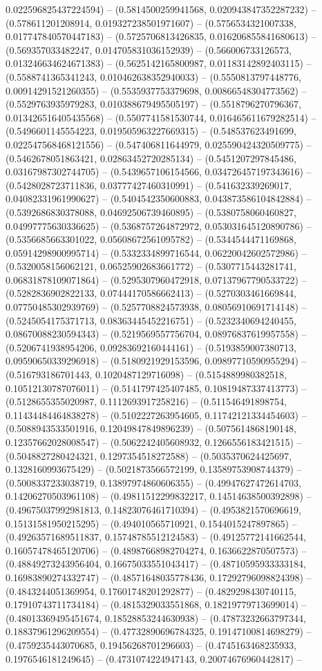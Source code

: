 0.022596825437224594) -- (0.5814500259941568, 0.020943847352287232) -- (0.578611201208914, 0.019327238501971607) -- (0.5756534321007338, 0.017747840570447183) -- (0.5725706813426835, 0.016206855841680613) -- (0.569357033482247, 0.014705831036152939) -- (0.566006733126573, 0.013246634624671383) -- (0.5625142165800987, 0.01183142892403115) -- (0.5588741365341243, 0.010462638352940033) -- (0.5550813797448776, 0.00914291521260355) -- (0.5535937753379698, 0.00866548304773562) -- (0.5529763935979283, 0.010388679495505197) -- (0.5518796270796367, 0.013426516405435568) -- (0.5507741581530744, 0.016465611679282514) -- (0.5496601145554223, 0.019505963227669315) -- (0.548537623491699, 0.022547568468121556) -- (0.547406811644979, 0.025590424320509775) -- (0.5462678051863421, 0.02863452720285134) -- (0.5451207297845486, 0.03167987302744705) -- (0.5439657106154566, 0.034726457197343616) -- (0.5428028723711836, 0.03777427460310991) -- (0.541632339269017, 0.04082331961990627) -- (0.5404542350600883, 0.043873586104842884) -- (0.5392686830378088, 0.04692506739460895) -- (0.5380758060460827, 0.04997775630336625) -- (0.5368757264872972, 0.053031645120890786) -- (0.5356685663301022, 0.05608672561095782) -- (0.5344544471169868, 0.05914298900995714) -- (0.5332334899716544, 0.06220042602572986) -- (0.5320058156062121, 0.06525902683661772) -- (0.5307715443281741, 0.06831878109071864) -- (0.5295307960472918, 0.07137967790533722) -- (0.5282836902822133, 0.07444170586662413) -- (0.5270303461669844, 0.07750485302939769) -- (0.5257708824573938, 0.08056910691714148) -- (0.5245054175371713, 0.08363445452216751) -- (0.5232340694240455, 0.08670088230594343) -- (0.5219569557756704, 0.08976837619957558) -- (0.5206741938954206, 0.09283692160444161) -- (0.5193859007380713, 0.09590650339296918) -- (0.5180921929153596, 0.09897710590955294) -- (0.516793186701443, 0.1020487129716098) -- (0.5154889980382518, 0.10512130787076011) -- (0.5141797425407485, 0.10819487337413773) -- (0.5128655355020987, 0.1112693917258216) -- (0.511546491898754, 0.11434484464838278) -- (0.5102227263954605, 0.11742121334454603) -- (0.5088943533501916, 0.12049847849896239) -- (0.5075614868190148, 0.12357662028008547) -- (0.5062242405608932, 0.1266556183421515) -- (0.5048827280424321, 0.1297354518272588) -- (0.5035370624425697, 0.1328160993675429) -- (0.5021873566572199, 0.13589753908744379) -- (0.5008337233038719, 0.13897974860606355) -- (0.49947627472614703, 0.14206270503961108) -- (0.49811512299832217, 0.14514638500392898) -- (0.49675037992981813, 0.14823076461710394) -- (0.4953821570696619, 0.15131581950215295) -- (0.494010565710921, 0.1544015247897865) -- (0.49263571689511837, 0.15748785512124583) -- (0.49125772141662544, 0.16057478465120706) -- (0.48987668982704274, 0.1636622870507573) -- (0.48849273243956404, 0.16675033551043417) -- (0.48710595933333184, 0.16983890274332747) -- (0.48571648035778436, 0.17292796098824398) -- (0.4843244051369954, 0.17601748201292877) -- (0.4829298430740115, 0.17910743711734184) -- (0.4815329033551868, 0.18219779713699014) -- (0.48013369495451674, 0.18528853244630938) -- (0.47873232663797344, 0.18837961296209554) -- (0.47732890696784325, 0.19147100814698279) -- (0.4759235443070685, 0.19456268701296603) -- (0.4745163468235933, 0.1976546181249645) -- (0.4731074224947143, 0.20074676960442817) -- 